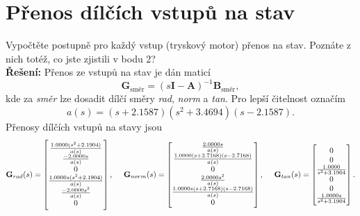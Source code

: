 \documentclass[twoside]{article}
\begin{document}
\section{Přenos dílčích vstupů na stav}
\label{sec:ukol3}
Vypočtěte postupně pro každý vstup (tryskový motor) přenos na stav. Poznáte z nich totéž, co jste zjistili
v bodu 2? \\
\textbf{Řešení:}
Přenos ze vstupů na stav je dán maticí 
\begin{equation}
	\mathbf{G}_{\text{směr}} = (s\mathbf{I}-\mathbf{A})^{-1} \mathbf{B}_{\text{směr}},
	\label{eq:prenos_vztah}
\end{equation}
kde za \textit{směr} lze dosadit dílčí směry \textit{rad}, \textit{norm} a \textit{tan}.
Pro lepší čitelnost označím
\begin{equation}
	a(s) = (s+2.1587)(s^2+3.4694)(s-2.1587).
	\label{eq:subs}
\end{equation}
Přenosy dílčích vstupů na stavy jsou
\begin{equation}
	\label{eq:prenosy}
	\mathbf{G}_{rad}(s) = \begin{bmatrix}
		
		\frac{1.0000(s^2+2.1904)     }{a(s)}          \\                
		\frac{-2.0000s        }{a(s)}                   \\               
		0                                    \\            
		\frac{1.0000s(s^2+2.1904)}{a(s)}              \\
		\frac{-2.0000s^2}{a(s)}                         \\               
		0                                                
	\end{bmatrix}, ~~~~                                                    
		\mathbf{G}_{norm}(s) =                       
		\begin{bmatrix}
			
			\frac{2.0000s}{a(s)}                                               \\
			\frac{1.0000(s+2.7168)(s-2.7168) }{a(s)}                \\           
			0                                        \\             
			\frac{2.0000s^2                  }{a(s)}           \\
			\frac{1.0000s(s+2.7168)(s-2.7168)}{a(s)}             \\              
			0                                                     
		\end{bmatrix}, ~~~~
		\mathbf{G}_{tan}(s) = \begin{bmatrix}
			
			0                              \\   
			0                             \\    
			\frac{1.0000}{s^2+3.1904}     \\       
			0                              \\
			0                               \\   
			\frac{1.0000s}{s^2+3.1904}                           
		\end{bmatrix}.
\end{equation}
\end{document}
